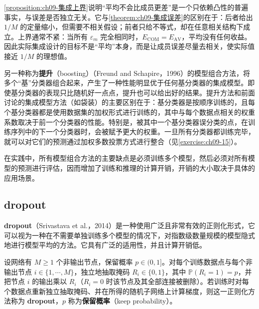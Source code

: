 \documentclass[../../main.tex]{subfiles}
\begin{document}
\begin{remark}\cref{proposition:ch09-集成上界}说明“平均不会比成员更差”是一个只依赖凸性的普遍事实，与误差是否独立无关。它与\cref{theorem:ch09-集成误差}的区别在于：后者给出 $1/M$ 的定量缩小，但需要不相关假设；前者只给不等式，却在任意相关结构下成立。上界通常不紧：当所有 $\varepsilon_{m}$ 完全相同时，$E_{\mathrm{COM}}=E_{\mathrm{AV}}$，平均没有任何收益。因此实际集成设计的目标不是“平均”本身，而是让成员误差尽量去相关，使实际值接近 $1/M$ 的理想值。
\end{remark}

另一种称为\textbf{提升}（boosting）（Freund and Schapire，1996）的模型组合方法，将多个“基”分类器组合起来，产生了一种性能明显优于任何基分类器的集成模型。即使基分类器的表现只比随机好一点点，提升也可以给出好的结果。提升方法和前面讨论的集成模型方法（如袋装）的主要区别在于：基分类器是按顺序训练的，且每个基分类器都是使用数据集的加权形式进行训练的，其中与每个数据点相关的权重系数取决于前一个分类器的性能。特别是，被其中一个基分类器误分类的点，在训练序列中的下一个分类器时，会被赋予更大的权重。一旦所有分类器都训练完毕，就可以对它们的预测通过加权多数投票方式进行整合（见\cref{exercise:ch09-15}）。

在实践中，所有模型组合方法的主要缺点是必须训练多个模型，然后必须对所有模型的预测进行评估，因而增加了训练和推理的计算开销，开销的大小取决于具体的应用场景。

\subsection{dropout}\label{subsection:ch09-dropout}

\textbf{dropout}（Srivastava et al.，2014）是一种使用广泛且非常有效的正则化形式，它可以视为一种在不需要单独训练多个模型的情况下，对指数级数量规模的模型隐式地进行模型平均的方法。它具有广泛的适用性，并且计算开销低。

\begin{definition}[dropout]\label{definition:ch09-dropout}
设网络有 $M\geqslant1$ 个非输出节点，保留概率 $p\in(0,1]$。对每个训练数据点与每个非输出节点 $i\in\{1,\cdots,M\}$，独立地抽取掩码 $R_{i}\in\{0,1\}$，其中 $\mathbb{P}(R_{i}=1)=p$，并把节点 $i$ 的输出乘以 $R_{i}$（$R_{i}=0$ 时该节点及其全部连接被删除）。若训练时对每个数据点重新独立抽取掩码、并在所得的随机子网络上计算梯度，则这一正则化方法称为 \textbf{dropout}，$p$ 称为\textbf{保留概率}（keep probability）。
\end{definition}
\end{document}
